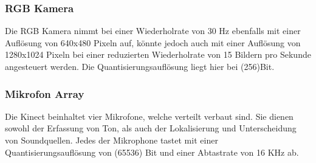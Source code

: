 \subsubsection{RGB Kamera}
Die RGB Kamera nimmt bei einer Wiederholrate von 30 Hz ebenfalls mit einer Auflösung von 640x480 Pixeln auf, könnte jedoch auch mit einer Auflösung von 1280x1024 Pixeln bei einer reduzierten Wiederholrate von 15 Bildern pro Sekunde angesteuert werden.
Die Quantisierungsauflösung liegt hier bei  (256)Bit. 
\subsubsection{Mikrofon Array}
Die Kinect beinhaltet vier Mikrofone, welche verteilt verbaut sind. Sie dienen sowohl der Erfassung von Ton, als auch der Lokalisierung und Unterscheidung von Soundquellen. Jedes der Mikrophone tastet mit einer Quantisierungsauflösung von  (65536) Bit und einer Abtastrate von 16 KHz ab.
